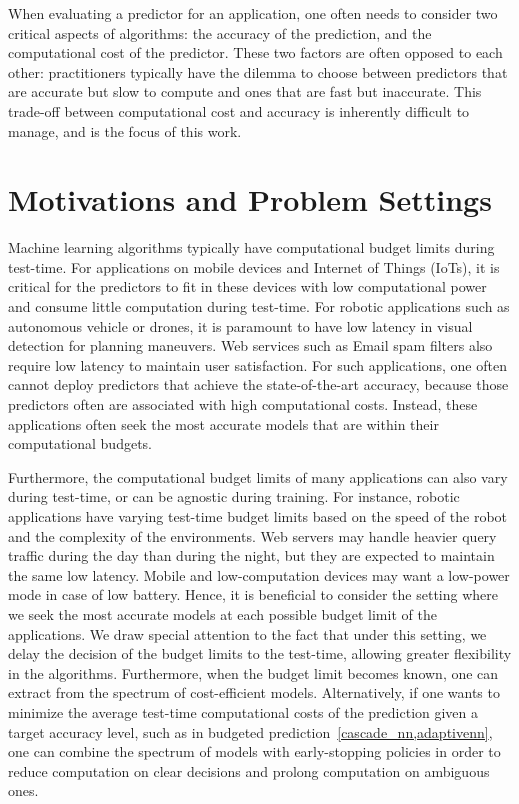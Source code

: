 

When evaluating a predictor for an application, one often needs to consider two critical aspects of algorithms: the accuracy of the prediction, and the computational cost of the predictor. These two factors are often opposed to each other: practitioners typically have the dilemma to choose between predictors that are accurate but slow to compute and ones that are fast but inaccurate. 
This trade-off between computational cost and accuracy is inherently difficult to manage, and is the focus of this work.


\section{Motivations and Problem Settings}

Machine learning algorithms typically have computational budget limits during test-time. For applications on mobile devices and Internet of Things (IoTs), it is critical for the predictors to fit in these devices with low computational power and consume little computation during test-time. For robotic applications such as autonomous vehicle or drones, it is paramount to have low latency in visual detection for planning maneuvers. Web services such as Email spam filters also require low latency to maintain user satisfaction. 
For such applications, one often cannot deploy predictors that achieve the state-of-the-art accuracy, because those predictors often are associated with high computational costs. Instead, these applications often seek the most accurate models that are within their computational budgets. 

Furthermore, the computational budget limits of many applications can also vary during test-time, or can be agnostic during training. 
For instance, robotic applications have varying test-time budget limits based on the speed of the robot and the complexity of the environments. 
Web servers may handle heavier query traffic during the day than during the night, but they are expected to maintain the same low latency. 
Mobile and low-computation devices may want a low-power mode in case of low battery. 
Hence, it is beneficial to consider the setting where we seek the most accurate models at each possible budget limit of the applications. 
We draw special attention to the fact that under this setting, we delay the decision of the budget limits to the test-time, allowing greater flexibility in the algorithms. Furthermore, when the budget limit becomes known, one can extract from the spectrum of cost-efficient models. Alternatively, if one wants to minimize the average test-time computational costs of the prediction given a target accuracy level, such as in budgeted prediction~\ref{cascade_nn,adaptivenn}, one can combine the spectrum of models with early-stopping policies in order to reduce computation on clear decisions and prolong computation on ambiguous ones.

